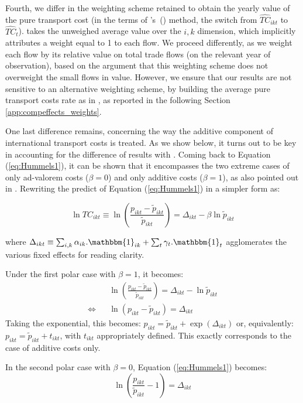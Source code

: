 \documentclass[a4paper,11pt]{article}
\newcommand\cites[1]{\citeauthor{#1}'s\ (\citeyear{#1})}
\begin{document}
Fourth, we differ in the weighting scheme retained to obtain the yearly value of the pure transport cost (in the terms of \cites{hummels2007} method, the switch from $\widehat{TC}_{ikt}$ to $\widehat{TC}_{t}$). \cite{hummels2007} takes the unweighed average value over the $i,k$ dimension, which implicitly attributes a weight equal to 1 to each flow. We proceed differently, as we weight each flow by its relative value on total trade flows (on the relevant year of observation), based on the argument that this weighting scheme does not overweight the small flows in value. However, we ensure that our results are not sensitive to an alternative weighting scheme, by building the average pure transport costs rate as in \cite{hummels2007}, as reported in the following Section \ref{app:compeffects_weights}.

One last difference remains, concerning the way the additive component of international transport costs is treated.
As we show below, it turns out to be key in accounting for the difference of results with \cite{hummels2007}.
Coming back to Equation (\ref{eq:Hummels1}), it can be shown that it encompasses the two extreme cases of only ad-valorem costs ($\beta = 0$) and only additive costs ($\beta=1$), as also pointed out in \cite{hummels_skiba}. Rewriting the predict of Equation (\ref{eq:Hummels1}) in a simpler form as:

$$\ln TC_{ikt} \equiv \ln \left(\frac{p_{ikt}- \widetilde{p}_{ikt}}{\widetilde{p}_{ikt}} \right) = \Delta_{ikt}- \beta \ln \widetilde{p}_{ikt} $$

\noindent where $\Delta_{ikt} \equiv \sum_{i,k}\alpha_{ik}.\mathbbm{1}_{ik}+ \sum_{t}\gamma_{t}.\mathbbm{1}_{t}$ agglomerates the various fixed effects for reading clarity.

Under the first polar case with $\beta = 1$, it becomes:
\begin{eqnarray*}
&&\ln \left(\frac{p_{ikt}- \widetilde{p}_{ikt}}{\widetilde{p}_{ikt}} \right) = \Delta_{ikt}- \ln \widetilde{p}_{ikt} \\
\Leftrightarrow && \ln (p_{ikt}- \widetilde{p}_{ikt}) = \Delta_{ikt}
\end{eqnarray*}
\noindent Taking the exponential, this becomes: $p_{ikt} = \widetilde{p}_{ikt} + \exp(\Delta_{ikt})$ or, equivalently: $p_{ikt} = \widetilde{p}_{ikt} + t_{ikt}$, with $t_{ikt}$ appropriately defined. This exactly corresponds to the case of additive costs only.

In the second polar case with $\beta = 0$, Equation (\ref{eq:Hummels1}) becomes:
$$\ln \left(\frac{p_{ikt}}{\widetilde{p}_{ikt}}-1\right) = \Delta_{ikt}$$
\end{document}

